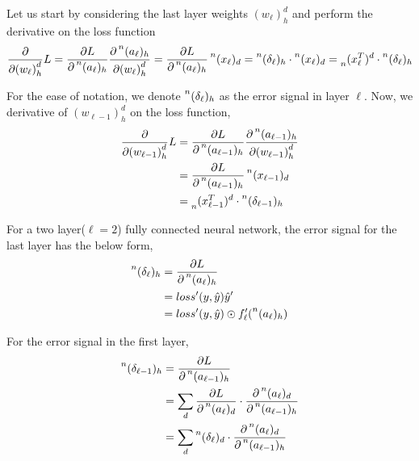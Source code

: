 \documentclass[12pt,a4paper]{article}%
\theoremstyle{definition}
\theoremstyle{plain}
\numberwithin{equation}{section}
\newcounter{subsubsubsection}[subsubsection]
\begin{document}
Let us start by considering the last layer weights ${(w_{\ell})}^{d}_{h} $ and perform the derivative on the loss function
\begin{equation}
\frac{\partial}{\partial {(w_{\ell})}^{d}_{h}} L = \frac{\partial L}{\partial \prescript{n}{}{(a_{\ell})}_{h}} \frac{\partial \prescript{n}{}{(a_{\ell})}_{h}}{\partial {(w_{\ell})}^{d}_{h}} = \frac{\partial L}{\partial \prescript{n}{}{(a_{\ell})}_{h}}  \prescript{n}{}{(x_{\ell})}_{d} =  \prescript{n}{}{(\delta_{\ell})}_{h} \cdot \prescript{n}{}{(x_{\ell})}_{d} = \prescript{}{n}{(x_{\ell}^{T})}^{d} \cdot \prescript{n}{}{(\delta_{\ell})}_{h} 
\end{equation}

For the ease of notation,  we denote  $\prescript{n}{}{(\delta_{\ell})}_{h}$ as the error signal in layer $\ell$. Now, we derivative of ${(w_{\ell-1})}^{d}_{h}$ on the loss function, 
\begin{align}
\frac{\partial}{\partial {(w_{\ell-1})}^{d}_{h}} L  &=  \frac{\partial L}{\partial \prescript{n}{}{(a_{\ell-1})}_{h}} \frac{\partial \prescript{n}{}{(a_{\ell-1})}_{h}}{\partial {(w_{\ell-1})}^{d}_{h}} \\
& = \frac{\partial L}{\partial \prescript{n}{}{(a_{\ell-1})}_{h}}  \prescript{n}{}{(x_{\ell-1})}_{d} \\
& = \prescript{}{n}{(x_{\ell-1}^{T})}^{d} \cdot \prescript{n}{}{(\delta_{\ell-1})}_{h} 
\end{align}


For a two layer($\ell = 2$) fully connected neural network,  the error signal for the last layer has the below form,
\begin{align}
\begin{split}
\prescript{n}{}{(\delta_{\ell})}_{h} &= \frac{\partial L}{\partial \prescript{n}{}{(a_{\ell})}_{h}} \\
															  &= loss'(y,\hat{y}) \hat{y}' \\
															  &= loss'(y,\hat{y}) \odot f'_{\ell}(\prescript{n}{}{(a_{\ell})}_{h})
\end{split}
\end{align}

For the error signal in the first layer,
\begin{align*}
\begin{split}
\prescript{n}{}{(\delta_{\ell-1})}_{h} &= \frac{\partial L}{\partial \prescript{n}{}{(a_{\ell-1})}_{h}} \\
																  &= \sum\limits_{d} \frac{\partial L}{\partial \prescript{n}{}{(a_{\ell})}_{d}} \cdot \frac{\partial \prescript{n}{}{(a_{\ell})}_{d}}{\partial \prescript{n}{}{(a_{\ell-1})}_{h}} \\
														          &= \sum\limits_{d} 	\prescript{n}{}{(\delta_{\ell})}_{d} \cdot \frac{\partial \prescript{n}{}{(a_{\ell})}_{d}}{\partial \prescript{n}{}{(a_{\ell-1})}_{h}}			  
\end{split}
\label{delta1}
\end{align*}
\end{document}
